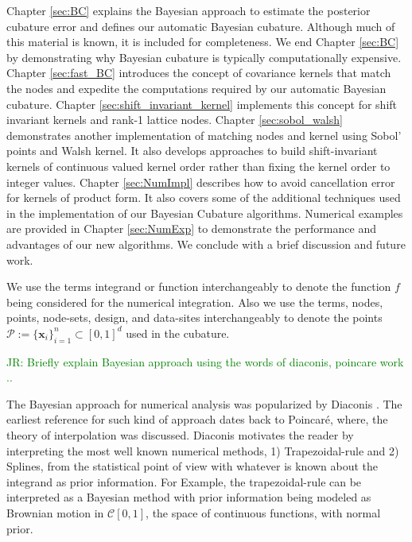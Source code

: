 \documentclass{iitthesis}          %
\newcommand{\bm}[1]{\boldsymbol{#1}}
\newcommand{\vx}{\bm{x}}
\newcommand{\JRNote}[1]{{\textcolor{green}{JR: #1}}}
\begin{document}
Chapter \ref{sec:BC} explains the Bayesian approach to estimate the posterior cubature error and defines our automatic Bayesian cubature. Although much of this material is known, it is included for completeness.  We end Chapter \ref{sec:BC}  by demonstrating why Bayesian cubature is typically computationally expensive.
Chapter \ref{sec:fast_BC}  introduces the concept of covariance kernels that match the nodes and expedite the computations required by our automatic Bayesian cubature. 
Chapter \ref{sec:shift_invariant_kernel} implements this concept for shift invariant kernels and rank-1 lattice nodes. 
Chapter \ref{sec:sobol_walsh} demonstrates another implementation of matching nodes and kernel using Sobol' points and Walsh kernel. It also develops approaches to build shift-invariant kernels of continuous valued kernel order rather than fixing the kernel order to integer values.
Chapter \ref{sec:NumImpl} describes how to avoid cancellation error for kernels of product form. 
It also covers  some of the additional techniques used in the implementation of our Bayesian Cubature algorithms. 
Numerical examples are provided in Chapter \ref{sec:NumExp} to demonstrate the performance and advantages of our new algorithms.  We conclude with a brief discussion and future work.


We use the terms integrand or function interchangeably to denote the function $f$ being considered for the numerical integration. Also we use the terms, nodes, points, node-sets, design, and data-sites interchangeably to denote the points $\mathcal{P} := \{\vx_i\}_{i=1}^n \subset [0,1]^d$ used in the cubature.













\label{sec:BC} 
\JRNote{Briefly explain Bayesian approach using the words of diaconis, poincare work ..}


The Bayesian approach for numerical analysis was popularized by Diaconis \cite{Dia88a}. The earliest reference for such kind of approach dates back to Poincar\'e, where, the theory of interpolation was discussed.
Diaconis motivates the reader by interpreting the most well known numerical methods, 1) Trapezoidal-rule and 2) Splines, from the statistical point of view with whatever is known about the integrand as prior information. 
For Example, the trapezoidal-rule can be interpreted as a Bayesian method with prior information being modeled as Brownian motion in $\mathcal{C}[0,1]$, the space of continuous functions, with normal prior.
\end{document}
